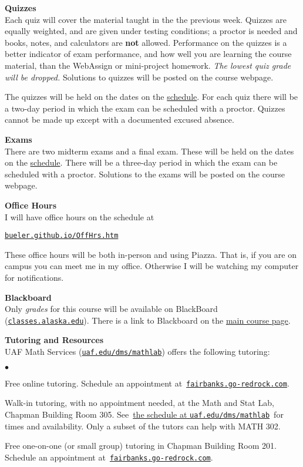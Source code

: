 \documentclass[12pt]{article}
\renewcommand{\emph}[1]{\textsf{\textbf{#1}}}
\newcommand{\localhead}[1]{\par\smallskip\textbf{#1}\nobreak\\}%
\def\heading#1{\localhead{\large\emph{#1}}}
\def\subheading#1{\localhead{\emph{#1}}}
\newenvironment{clist}%
{\bgroup\parskip 0pt\begin{list}{$\bullet$}{\partopsep 4pt\topsep 0pt\itemsep -2pt}}%
{\end{list}\egroup}%
\begin{document}
\subheading{Quizzes}
Each quiz will cover the material taught in the the previous week.  Quizzes are equally weighted, and are given under testing conditions; a proctor is needed and books, notes, and calculators are \emph{not} allowed.  Performance on the quizzes is a better indicator of exam performance, and how well you are learning the course material, than the WebAssign or mini-project homework.  \textsl{The lowest quiz grade will be dropped.}  Solutions to quizzes will be posted on the course webpage.

The quizzes will be held on the dates on the \href{https://bueler.github.io/math302/schedule.pdf}{schedule}.  For each quiz there will be a two-day period in which the exam can be scheduled with a proctor.  Quizzes cannot be made up except with a documented excused absence.

\subheading{Exams}
There are two midterm exams and a final exam.  These will be held on the dates on the \href{https://bueler.github.io/math302/schedule.pdf}{schedule}.  There will be a three-day period in which the exam can be scheduled with a proctor.  Solutions to the exams will be posted on the course webpage.


\heading{Office Hours}
I will have office hours on the schedule at

\smallskip
\centerline{\href{http://bueler.github.io/OffHrs.htm}{\tt bueler.github.io/OffHrs.htm}}

These office hours will be both in-person and using Piazza.  That is, if you are on campus you can meet me in my office.  Otherwise I will be watching my computer for notifications.


\heading{Blackboard}
Only \textsl{grades} for this course will be available on BlackBoard (\href{https://classes.alaska.edu/}{\tt classes.alaska.edu}).  There is a link to Blackboard on the \href{https://bueler.github.io/math302/}{main course page}.


\heading{Tutoring and Resources}
UAF Math Services (\href{http://www.uaf.edu/dms/mathlab/}{\texttt{uaf.edu/dms/mathlab}}) offers the following tutoring:
\begin{clist}
	\item Free online tutoring.  Schedule an appointment at\, \href{https://fairbanks.go-redrock.com/}{\texttt{fairbanks.go-redrock.com}}.
	\item Walk-in tutoring, with no appointment needed, at the Math and Stat Lab, Chapman Building Room 305.  See\, \href{https://uaf.edu/dms/mathlab/math-and-stat-lab-schedul-1/}{the schedule at \texttt{uaf.edu/dms/mathlab}}\, for times and availability.  Only a subset of the tutors can help with MATH 302.
	\item Free one-on-one (or small group) tutoring in Chapman Building Room 201.  Schedule an appointment at\, \href{https://fairbanks.go-redrock.com/}{\texttt{fairbanks.go-redrock.com}}.
\end{clist}
\end{document}
